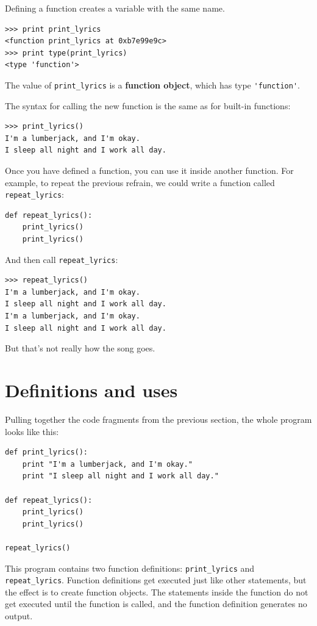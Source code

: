 \documentclass[10pt]{book}
\begin{document}
Defining a function creates a variable with the same name.

\beforeverb
\begin{verbatim}
>>> print print_lyrics
<function print_lyrics at 0xb7e99e9c>
>>> print type(print_lyrics)
<type 'function'>
\end{verbatim}
\afterverb
%
The value of \verb"print_lyrics" is a {\bf function object}, which
has type \verb"'function'".


The syntax for calling the new function is the same as
for built-in functions:

\beforeverb
\begin{verbatim}
>>> print_lyrics()
I'm a lumberjack, and I'm okay.
I sleep all night and I work all day.
\end{verbatim}
\afterverb
%
Once you have defined a function, you can use it inside another
function.  For example, to repeat the previous refrain, we could write
a function called \verb"repeat_lyrics":

\beforeverb
\begin{verbatim}
def repeat_lyrics():
    print_lyrics()
    print_lyrics()
\end{verbatim}
\afterverb
%
And then call \verb"repeat_lyrics":

\beforeverb
\begin{verbatim}
>>> repeat_lyrics()
I'm a lumberjack, and I'm okay.
I sleep all night and I work all day.
I'm a lumberjack, and I'm okay.
I sleep all night and I work all day.
\end{verbatim}
\afterverb
%
But that's not really how the song goes.


\section{Definitions and uses}

Pulling together the code fragments from the previous section, the
whole program looks like this:

\beforeverb
\begin{verbatim}
def print_lyrics():
    print "I'm a lumberjack, and I'm okay."
    print "I sleep all night and I work all day."

def repeat_lyrics():
    print_lyrics()
    print_lyrics()

repeat_lyrics()
\end{verbatim}
\afterverb
%
This program contains two function definitions: \verb"print_lyrics" and
\verb"repeat_lyrics".  Function definitions get executed just like other
statements, but the effect is to create function objects.  The statements
inside the function do not get executed until the function is called, and
the function definition generates no output.
\end{document}
